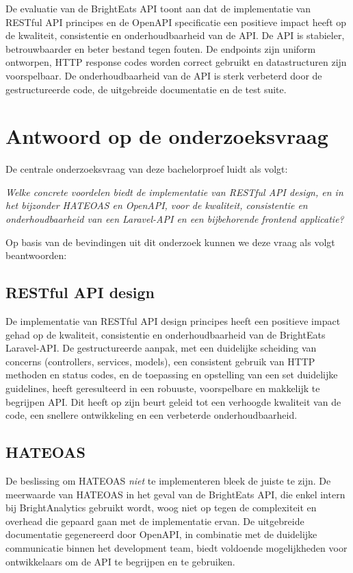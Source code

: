 \bigskip

De evaluatie van de Bright\-Eats API toont aan dat de implementatie van RESTful API principes en de OpenAPI specificatie een positieve impact heeft op de kwaliteit, consistentie en onderhoudbaarheid van de API. De API is stabieler, betrouwbaarder en beter bestand tegen fouten. De endpoints zijn uniform ontworpen, HTTP response codes worden correct gebruikt en datastructuren zijn voorspelbaar. De onderhoudbaarheid van de API is sterk verbeterd door de gestructureerde code, de uitgebreide documentatie en de test suite.

\section{Antwoord op de onderzoeksvraag}

De centrale onderzoeksvraag van deze bachelorproef luidt als volgt:

\begin{displayquote}
  \textit{Welke concrete voordelen biedt de implementatie van RESTful API design, en in het bijzonder HATEOAS en OpenAPI, voor de kwaliteit, consistentie en onderhoudbaarheid van een Laravel-API en een bijbehorende frontend applicatie?}
\end{displayquote}

Op basis van de bevindingen uit dit onderzoek kunnen we deze vraag als volgt beantwoorden:

\subsection{RESTful API design}

De implementatie van RESTful API design principes heeft een positieve impact gehad op de kwaliteit, consistentie en onderhoudbaarheid van de Bright\-Eats Laravel-API. De gestructureerde aanpak, met een duidelijke scheiding van concerns (controllers, services, models), een consistent gebruik van HTTP methoden en status codes, en de toepassing en opstelling van een set duidelijke guidelines, heeft geresulteerd in een robuuste, voorspelbare en makkelijk te begrijpen API. Dit heeft op zijn beurt geleid tot een verhoogde kwaliteit van de code, een snellere ontwikkeling en een verbeterde onderhoudbaarheid.

\subsection{HATEOAS}

De beslissing om HATEOAS \textit{niet} te implementeren bleek de juiste te zijn. De meerwaarde van HATEOAS in het geval van de Bright\-Eats API, die enkel intern bij BrightAnalytics gebruikt wordt, woog niet op tegen de complexiteit en overhead die gepaard gaan met de implementatie ervan. De uitgebreide documentatie gegenereerd door OpenAPI, in combinatie met de duidelijke communicatie binnen het development team, biedt voldoende mogelijkheden voor ontwikkelaars om de API te begrijpen en te gebruiken.

